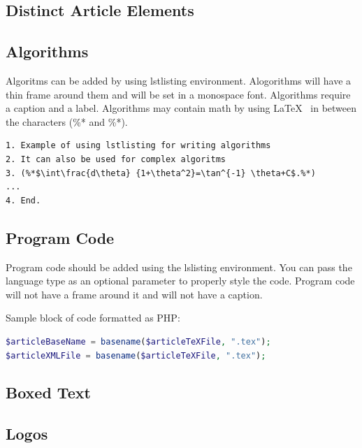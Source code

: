 \documentclass{csmagazine}
\begin{document}
\begin{flushleft}
\section{Distinct Article Elements}

\subsection{Algorithms}

Algoritms can be added by using lstlisting environment. Alogorithms will have a thin frame around them and will be set in a monospace font. Algorithms require a caption and a label. Algorithms may contain math by using \LaTeX~ in between the characters (\%* and \%*).

\pagebreak

\begin{lstlisting}[caption={Add a caption for your algorithm here}, captionpos=b, label=Algorithm1, frame=single]
1. Example of using lstlisting for writing algorithms
2. It can also be used for complex algoritms
3. (%*$\int\frac{d\theta} {1+\theta^2}=\tan^{-1} \theta+C$.%*)
...
4. End. 
\end{lstlisting}

\subsection{Program Code}

Program code should be added using the lslisting environment. You can pass the language type as an optional parameter to properly style the code. Program code will not have a frame around it and will not have a caption.

Sample block of code formatted as PHP:

\begin{lstlisting}[language=PhP]
$articleBaseName = basename($articleTeXFile, ".tex");
$articleXMLFile = basename($articleTeXFile, ".tex");
\end{lstlisting}


\subsection{Boxed Text}



\subsection{Logos}


\end{flushleft}
\end{document}
